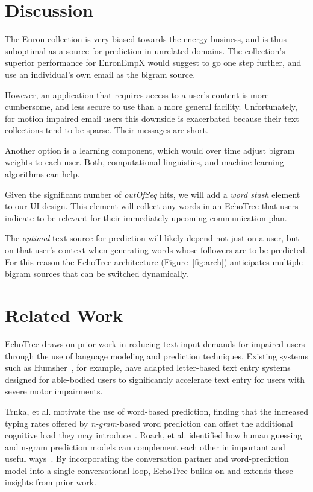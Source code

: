 \documentclass{sigchi}
\begin{document}
\section{Discussion}
The Enron collection is very biased towards the energy business, and
is thus suboptimal as a source for prediction in unrelated
domains. The collection's superior performance for EnronEmpX would
suggest to go one step further, and use an individual's own email as
the bigram source. 

However, an application that requires access to a user's content is
more cumbersome, and less secure to use than a more general facility.
Unfortunately, for motion impaired email users this downside is
exacerbated because their text collections tend to be sparse.
Their messages are short.

Another option is a learning component, which would over time adjust
bigram weights to each user. Both, computational linguistics, and
machine learning algorithms can help.

Given the significant number of {\em outOfSeq} hits, we will add
a {\em word stash} element to our UI design. This element will collect
any words in an EchoTree that users indicate to be relevant for their
immediately upcoming communication plan.

The {\em optimal} text source for prediction will likely depend not just on
a user, but on that user's context when generating words whose
followers are to be predicted. For this reason the EchoTree
architecture (Figure~\ref{fig:arch}) anticipates multiple bigram
sources that can be switched dynamically.

\section{Related Work}
EchoTree draws on prior work in reducing text input demands for
impaired users through the use of language modeling and prediction
techniques. Existing systems such as Humsher~\cite{Polacek2011}, for
example, have adapted letter-based text entry systems designed for
able-bodied users to significantly accelerate text entry for users
with severe motor impairments.

Trnka, et al. motivate the use of word-based prediction, finding that
the increased typing rates offered by {\em n-gram}-based word
prediction can offset the additional cognitive load they may
introduce~\cite{Trnka2009}. Roark, et al. identified how human
guessing and n-gram prediction models can complement each other in
important and useful ways~\cite{Roark2011}. By incorporating the
conversation partner and word-prediction model into a single
conversational loop, EchoTree builds on and extends these insights
from prior work.
\end{document}
